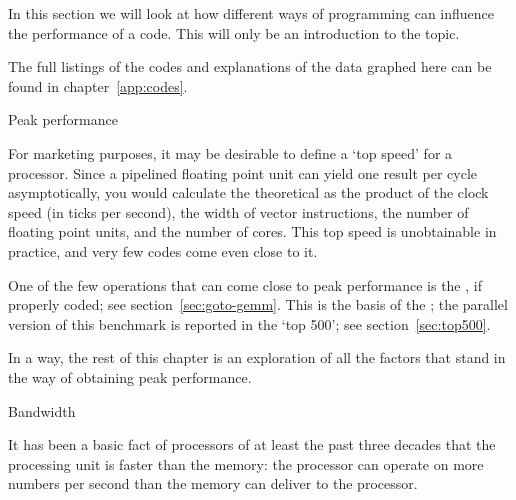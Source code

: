 

In this section we will look at how different ways of programming can
influence the performance of a code. This will only be an introduction
to the topic.

The full listings of the codes and explanations of the data graphed
here can be found in chapter~\ref{app:codes}.

 {Peak performance}

For marketing purposes, it may be desirable to define a `top speed' for a processor.
Since a pipelined floating point unit can yield one result per
cycle asymptotically, you would calculate the theoretical
 as the product of the clock speed
(in ticks per second),
the width of vector instructions,
the number of floating point units, and the number of cores.
This top speed is unobtainable in practice, and very few codes come even close to it.

One of the few operations that can come close to peak performance
is the ,
if properly coded; see section~\ref{sec:goto-gemm}.
This is the basis of the ;
the parallel version of this benchmark is reported
in the `top 500'; see section~\ref{sec:top500}. 

In a way, the rest of this chapter is an exploration
of all the factors that stand in the way of obtaining
peak performance.

 {Bandwidth}


It has been a basic fact of processors of at least the past three decades
that the processing unit is faster than the memory:
the processor can operate on more numbers per second than
the memory can deliver to the processor.

